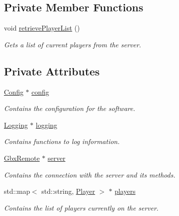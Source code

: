 \subsection*{Private Member Functions}
\begin{DoxyCompactItemize}
\item 
void \hyperlink{classManiaPP_aede94c0b982250de19186d447542e479}{retrieve\-Player\-List} ()
\begin{DoxyCompactList}\small\item\em Gets a list of current players from the server. \end{DoxyCompactList}\end{DoxyCompactItemize}
\subsection*{Private Attributes}
\begin{DoxyCompactItemize}
\item 
\hyperlink{classConfig}{Config} $\ast$ \hyperlink{classManiaPP_a9a91437fa70afd52c2dce19298888e36}{config}
\begin{DoxyCompactList}\small\item\em Contains the configuration for the software. \end{DoxyCompactList}\item 
\hyperlink{classLogging}{Logging} $\ast$ \hyperlink{classManiaPP_aa4cea090301bdf0bf652ad377e7b01c0}{logging}
\begin{DoxyCompactList}\small\item\em Contains functions to log information. \end{DoxyCompactList}\item 
\hyperlink{classGbxRemote}{Gbx\-Remote} $\ast$ \hyperlink{classManiaPP_ab81311d6901990cb99a7a30e0cbaab11}{server}
\begin{DoxyCompactList}\small\item\em Contains the connection with the server and its methods. \end{DoxyCompactList}\item 
std\-::map$<$ std\-::string, \hyperlink{structPlayer}{Player} $>$ $\ast$ \hyperlink{classManiaPP_a45712ccfa91b20242b39cb1164d305d8}{players}
\begin{DoxyCompactList}\small\item\em Contains the list of players currently on the server. \end{DoxyCompactList}\end{DoxyCompactItemize}



